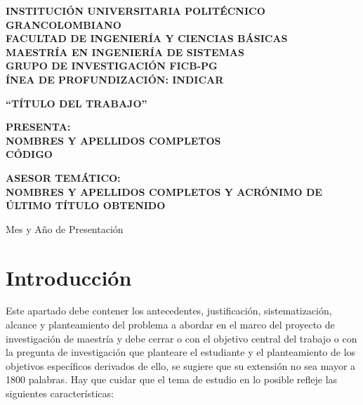\documentclass[spanish, letterpaper, 12pt]{book}
\begin{document}
\renewcommand{\BOthers}[1]{et al.\hbox{}}

\frontmatter

\begin{titlepage}
	\begin{center}
		\textbf{
			INSTITUCIÓN UNIVERSITARIA POLITÉCNICO GRANCOLOMBIANO \\
			FACULTAD DE INGENIERÍA Y CIENCIAS BÁSICAS \\
			MAESTRÍA EN INGENIERÍA DE SISTEMAS \\
			GRUPO DE INVESTIGACIÓN FICB-PG \\
			ÍNEA DE PROFUNDIZACIÓN: INDICAR
		}
		\vspace{1cm}
		
		\textbf{“TÍTULO DEL TRABAJO”}
		
		\vspace{3cm}
		\textbf{
			PRESENTA: \\
			NOMBRES Y APELLIDOS COMPLETOS \\
			CÓDIGO
		}
		
		\vspace{1.5cm}
		\textbf{
			ASESOR TEMÁTICO: \\
			NOMBRES Y APELLIDOS COMPLETOS Y ACRÓNIMO DE ÚLTIMO TÍTULO OBTENIDO
		}
			
		\vspace{5cm}
		
		Mes y Año de Presentación

	\end{center}
\end{titlepage}

\tableofcontents
\listoftables
\listoffigures

\mainmatter

\chapter{Introducción}
Este apartado debe contener los antecedentes, justificación, sistematización, alcance y planteamiento del problema a abordar en el marco del proyecto de investigación de maestría y debe cerrar o con el objetivo central del trabajo o con la pregunta de investigación que planteare el estudiante y el planteamiento de los objetivos específicos derivados de ello, se sugiere que su extensión no sea mayor a 1800 palabras. Hay que cuidar que el tema de estudio en lo posible refleje las siguientes características:
\end{document}
